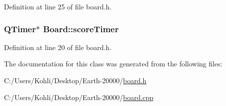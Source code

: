 Definition at line 25 of file board.h.\hypertarget{class_board_a99a70247c4e08e4bff96cd3cd10c135b}{
\subsubsection[{scoreTimer}]{\setlength{\rightskip}{0pt plus 5cm}QTimer$\ast$ {\bf Board::scoreTimer}}}
\label{class_board_a99a70247c4e08e4bff96cd3cd10c135b}


Definition at line 20 of file board.h.

The documentation for this class was generated from the following files:\begin{DoxyCompactItemize}
\item 
C:/Users/Kohli/Desktop/Earth-\/20000/\hyperlink{board_8h}{board.h}\item 
C:/Users/Kohli/Desktop/Earth-\/20000/\hyperlink{board_8cpp}{board.cpp}\end{DoxyCompactItemize}
